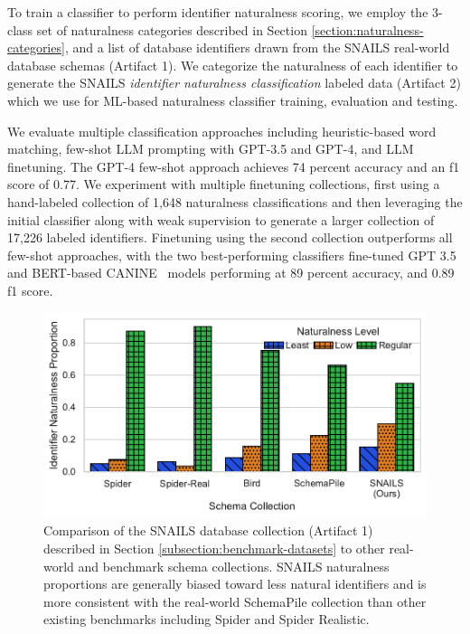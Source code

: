 To train a classifier to perform identifier naturalness scoring, we employ the 3-class set of naturalness categories described in Section \ref{section:naturalness-categories}, and a list of database identifiers drawn from the SNAILS real-world database schemas (Artifact 1).
We categorize the naturalness of each identifier to generate the SNAILS \emph{identifier naturalness classification} labeled data (Artifact 2) which we use for ML-based naturalness classifier training, evaluation and testing.

We evaluate multiple classification approaches including heuristic-based word matching, few-shot LLM prompting with GPT-3.5 and GPT-4, and LLM finetuning.
The GPT-4 few-shot approach achieves 74 percent accuracy and an f1 score of 0.77.
We experiment with multiple finetuning collections, first using a hand-labeled collection of 1,648 naturalness classifications and then leveraging the initial classifier along with weak supervision to generate a larger collection of 17,226 labeled identifiers.
Finetuning using the second collection outperforms all few-shot approaches, with the
two best-performing classifiers fine-tuned GPT 3.5 and BERT-based CANINE~\cite{Clark-2022} models performing at 89 percent accuracy, and 0.89 f1 score.

\begin{figure}
  \centering
  \includegraphics[width=\figwidthmod\linewidth]{figures/benchmark_naturalness_compare.pdf}
  \caption{Comparison of the SNAILS database collection (Artifact 1) described in Section \ref{subsection:benchmark-datasets} to other real-world and benchmark schema collections. SNAILS naturalness proportions are generally biased toward less natural identifiers and is more consistent with the real-world SchemaPile collection than other existing benchmarks including Spider and Spider Realistic.}
  \label{fig:naturalnesscompare}
\end{figure}



